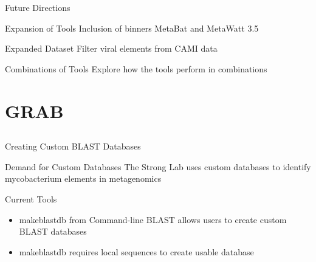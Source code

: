 \documentclass[11pt]{beamer}
\begin{document}
	\begin{frame}{Future Directions}
	
	\begin{block}{Expansion of Tools}
	Inclusion of binners MetaBat and MetaWatt 3.5
	\end{block}
	
	\begin{block}{Expanded Dataset}
	Filter viral elements from CAMI data
	\end{block}
	
	\begin{block}{Combinations of Tools}
	Explore how the tools perform in combinations
	\end{block}
	
	\end{frame}

\section{GRAB}
\subsection{}

	
	\begin{frame}{Creating Custom BLAST Databases}
	\begin{block}{Demand for Custom Databases}
	The Strong Lab uses custom databases to identify mycobacterium elements in metagenomics
	\end{block}
	
	\begin{block}{Current Tools}
	\begin{itemize}
	\item makeblastdb from Command-line BLAST allows users to create custom BLAST databases
	\item makeblastdb requires local sequences to create usable database
	\end{itemize}
	\end{block}
	\end{frame}
	
\end{document}
